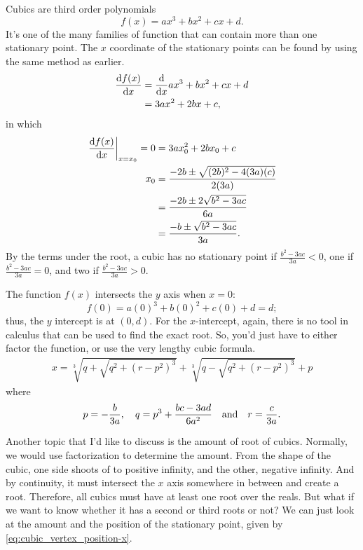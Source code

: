 Cubics are third order polynomials
\begin{equation}
  f(x) = ax^3 + bx^2 + cx + d.
\end{equation}
It's one of the many families of function that can contain more than one stationary point. The $x$ coordinate of the stationary points can be found by using the same method as earlier.
\begin{align}
  \odv{f(x)}{x} & = \odv*{ax^3 + bx^2 + cx + d}{x} \\
                & = 3ax^2 + 2bx + c,
\end{align}
in which
\begin{align}
  \odv{f(x)}{x}_{x = x_0} = 0 & = 3ax_0^2 + 2bx_0 + c                                                     \\
  x_0                         & = \frac{- 2b \pm \sqrt{(2b)^2 - 4(3a)(c)}}{2(3a)}                         \\
                              & = \frac{- 2b \pm 2\sqrt{b^2 - 3ac}}{6a}                                   \\
                              & = \frac{- b \pm \sqrt{b^2 - 3ac}}{3a}. \label{eq:cubic_vertex_position-x}
\end{align}
By the terms under the root, a cubic has no stationary point if $\frac{b^2 - 3ac}{3a} < 0$, one if $\frac{b^2 - 3ac}{3a} = 0$, and two if $\frac{b^2 - 3ac}{3a} > 0$.

The function $f(x)$ intersects the $y$ axis when $x = 0$:
\begin{equation}
  f(0) = a(0)^3 + b(0)^2 + c(0) + d = d;
\end{equation}
thus, the $y$ intercept is at $(0, d)$. For the $x$-intercept, again, there is no tool in calculus that can be used to find the exact root. So, you'd just have to either factor the function, or use the very lengthy cubic formula.
\begin{equation}
  \begin{gathered}
    x = \sqrt[3]{q + \sqrt{q^2 + (r - p^2)^3}} + \sqrt[3]{q - \sqrt{q^2 + (r - p^2)^3}} + p
  \end{gathered}
\end{equation}
where
\begin{equation}
  p = -\frac{b}{3a}, \quad q = p^3 + \frac{bc - 3ad}{6a^2} \quad\textrm{and}\quad r = \frac{c}{3a}.
\end{equation}


Another topic that I'd like to discuss is the amount of root of cubics. Normally, we would use factorization to determine the amount. From the shape of the cubic, one side shoots of to positive infinity, and the other, negative infinity. And by continuity, it must intersect the $x$ axis somewhere in between and create a root. Therefore, all cubics must have at least one root over the reals. But what if we want to know whether it has a second or third roots or not? We can just look at the amount and the position of the stationary point, given by \cref{eq:cubic_vertex_position-x}.

